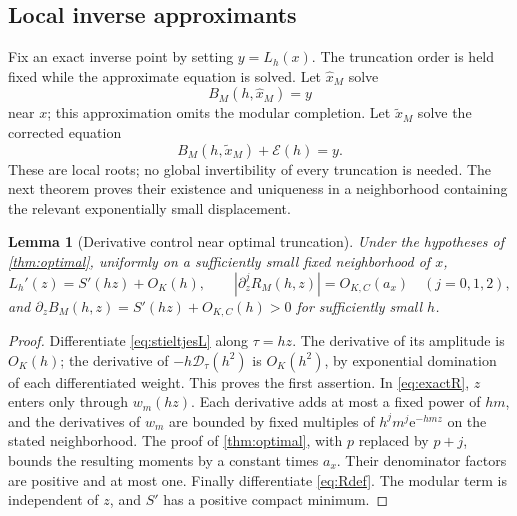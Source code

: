 \documentclass[11pt,a4paper]{article}
\newcommand{\ee}{\mathrm e}
\newcommand{\E}{\mathcal E}
\newcommand{\D}{\mathcal D}
\numberwithin{equation}{section}
\theoremstyle{plain}
\newtheorem{lemma}[theorem]{Lemma}
\theoremstyle{definition}
\theoremstyle{remark}
\begin{document}
\subsection{Local inverse approximants}
Fix an exact inverse point by setting $y=L_h(x)$. The truncation order is
held fixed while the approximate equation is solved. Let $\widehat x_M$ solve
\begin{equation}
 B_M(h,\widehat x_M)=y
 \label{eq:uncorrectedroot}
\end{equation}
near $x$; this approximation omits the modular completion. Let
$\widetilde x_M$ solve the corrected equation
\begin{equation}
 B_M(h,\widetilde x_M)+\E(h)=y.
 \label{eq:correctedroot}
\end{equation}
These are local roots; no global invertibility of every truncation is needed.
The next theorem proves their existence and uniqueness in a neighborhood
containing the relevant exponentially small displacement.

\begin{lemma}[Derivative control near optimal truncation]
\label{lem:dercontrol}
Under the hypotheses of \cref{thm:optimal}, uniformly on a sufficiently small
fixed neighborhood of $x$,
\begin{equation}
 L_h'(z)=S'(hz)+O_K(h),\qquad
 |\partial_z^jR_M(h,z)|=O_{K,C}(a_x)\quad(j=0,1,2),
 \label{eq:dercontrol}
\end{equation}
and $\partial_z B_M(h,z)=S'(hz)+O_{K,C}(h)>0$ for sufficiently small $h$.
\end{lemma}
\begin{proof}
Differentiate \eqref{eq:stieltjesL} along $\tau=hz$. The derivative of its
amplitude is $O_K(h)$; the derivative of $-h\D_\tau(h^2)$ is $O_K(h^2)$,
by exponential domination of each differentiated weight. This proves the
first assertion. In \eqref{eq:exactR}, $z$ enters only through $w_m(hz)$.
Each derivative adds at most a fixed power of $hm$, and the derivatives of
$w_m$ are bounded by fixed multiples of $h^jm^j\ee^{-hmz}$ on the stated
neighborhood. The proof of \cref{thm:optimal}, with $p$ replaced by $p+j$,
bounds the resulting moments by a constant times $a_x$. Their denominator
factors are positive and at most one. Finally differentiate \eqref{eq:Rdef}.
The modular term is independent of $z$, and $S'$ has a positive compact
minimum.
\end{proof}
\end{document}
